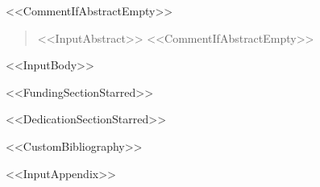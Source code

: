 \documentclass[%
<<DocumentClassOptions>>]{article}
\begin{document}


\printAffiliationsAndNotice{}

<<CommentIfAbstractEmpty>>\begin{abstract}
<<InputAbstract>>
<<CommentIfAbstractEmpty>>\end{abstract}

<<InputBody>>

<<FundingSectionStarred>>

<<DedicationSectionStarred>>


<<CustomBibliography>>

\appendix
\onecolumn
<<InputAppendix>>
\end{document}
